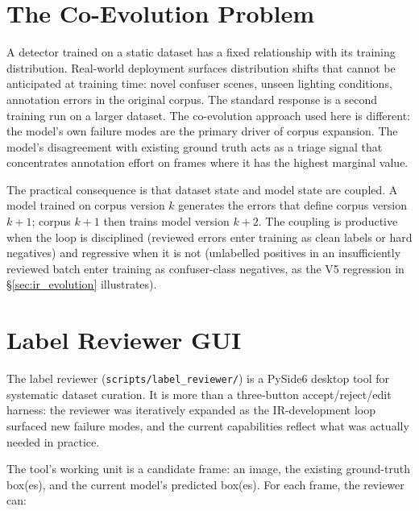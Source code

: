 \documentclass[12pt,a4paper,oneside,openright]{book}
\begin{document}
\section{The Co-Evolution Problem}
\label{sec:coevolution}

A detector trained on a static dataset has a fixed relationship with its training distribution. Real-world deployment surfaces distribution shifts that cannot be anticipated at training time: novel confuser scenes, unseen lighting conditions, annotation errors in the original corpus. The standard response is a second training run on a larger dataset. The co-evolution approach used here is different: the model's own failure modes are the primary driver of corpus expansion. The model's disagreement with existing ground truth acts as a triage signal that concentrates annotation effort on frames where it has the highest marginal value.

The practical consequence is that dataset state and model state are coupled. A model trained on corpus version $k$ generates the errors that define corpus version $k+1$; corpus $k+1$ then trains model version $k+2$. The coupling is productive when the loop is disciplined (reviewed errors enter training as clean labels or hard negatives) and regressive when it is not (unlabelled positives in an insufficiently reviewed batch enter training as confuser-class negatives, as the V5 regression in \S\ref{sec:ir_evolution} illustrates).

\section{Label Reviewer GUI}
\label{sec:label_reviewer}

The label reviewer (\texttt{scripts/label\_reviewer/}) is a PySide6 desktop tool for systematic dataset curation. It is more than a three-button accept/reject/edit harness: the reviewer was iteratively expanded as the IR-development loop surfaced new failure modes, and the current capabilities reflect what was actually needed in practice.

The tool's working unit is a candidate frame: an image, the existing ground-truth box(es), and the current model's predicted box(es). For each frame, the reviewer can:
\end{document}
